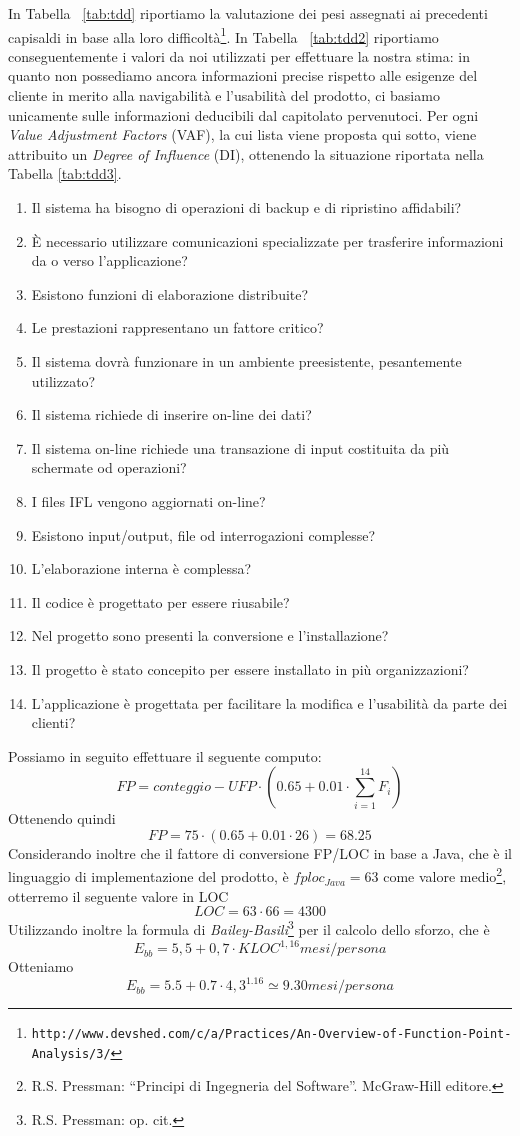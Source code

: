 In Tabella ~\vref{tab:tdd} riportiamo la valutazione dei pesi assegnati ai precedenti capisaldi
in base alla loro difficoltà\footnote{\texttt{http://www.devshed.com/c/a/Practices/An-Overview-of-Function-Point-Analysis/3/}}. In Tabella  ~\vref{tab:tdd2} riportiamo conseguentemente
i valori da noi utilizzati per effettuare la nostra stima: in quanto non possediamo
ancora informazioni precise rispetto alle esigenze del cliente in merito alla 
 navigabilità e l'usabilità del prodotto, ci basiamo unicamente sulle informazioni
 deducibili dal capitolato pervenutoci. Per ogni \textit{Value
Adjustment Factors} (VAF), la cui lista viene proposta qui sotto, viene attribuito
un \textit{Degree of Influence} (DI), ottenendo la situazione riportata nella Tabella
\vref{tab:tdd3}.

\begin{enumerate}
\item Il sistema ha bisogno di operazioni di backup e di ripristino affidabili?
\item È necessario utilizzare comunicazioni specializzate per trasferire informazioni da o verso l'applicazione?
\item Esistono funzioni di elaborazione distribuite?
\item Le prestazioni rappresentano un fattore critico?
\item Il sistema dovrà funzionare in un ambiente preesistente, pesantemente utilizzato?
\item Il sistema richiede di inserire on-line dei dati?
\item Il sistema on-line richiede una transazione di input costituita da più schermate od operazioni?
\item I files IFL vengono aggiornati on-line?
\item Esistono input/output, file od interrogazioni complesse?
\item L'elaborazione interna è complessa?
\item Il codice è progettato per essere riusabile?
\item Nel progetto sono presenti la conversione e l'installazione?
\item Il progetto è stato concepito per essere installato in più organizzazioni?
\item L'applicazione è progettata per facilitare la modifica e l'usabilità da parte dei clienti?
\end{enumerate}

Possiamo in seguito effettuare il seguente computo:
\[FP = conteggio-UFP \cdot (0.65+0.01\cdot\sum_{i=1}^{14} F_i)\]
Ottenendo quindi
\[FP = 75\cdot (0.65+0.01\cdot 26)=68.25\]
Considerando inoltre che il fattore di conversione FP/LOC in base a Java, che è il
linguaggio di implementazione del prodotto, è $fploc_{Java}=63$ come valore
medio\footnote{R.S. Pressman: ``Principi di Ingegneria del Software''. McGraw-Hill
editore.}, otterremo il seguente valore in LOC
\[LOC = 63\cdot 66=4300\]
Utilizzando inoltre la formula di \textit{Bailey-Basili}\footnote{R.S. Pressman: op. cit.} per il calcolo dello sforzo, che è
\[E_{bb} = 5,5+0,7\cdot {KLOC}^{1,16} mesi/persona\]
Otteniamo
\[E_{bb} = 5.5+0.7\cdot {4,3}^{1.16}\simeq 9.30 mesi/persona\]

